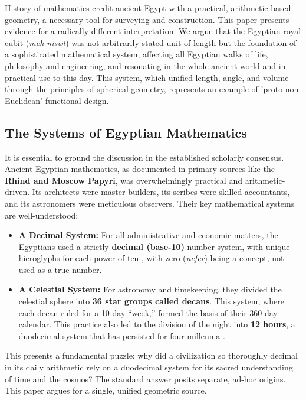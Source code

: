 \documentclass[11pt]{article}
\begin{document}
History of mathematics credit ancient Egypt with a practical, arithmetic-based geometry, a necessary tool for surveying and construction. This paper presents evidence for a radically different interpretation. We argue that the Egyptian royal cubit (\textit{meh niswt}) was not arbitrarily stated unit of length but the foundation of a sophisticated mathematical system, affecting all Egyptian walks of life, philosophy and engineering, and resonating in the whole ancient world and in practical use to this day. This system, which unified length, angle, and volume through the principles of spherical geometry, represents an example of 'proto-non-Euclidean' functional design.

\subsection{The Systems of Egyptian Mathematics}

It is essential to ground the discussion in the established scholarly consensus. Ancient Egyptian mathematics, as documented in primary sources like the \textbf{Rhind and Moscow Papyri}, was overwhelmingly practical and arithmetic-driven. Its architects were master builders, its scribes were skilled accountants, and its astronomers were meticulous observers. Their key mathematical systems are well-understood:
\begin{itemize}
    \item \textbf{A Decimal System:} For all administrative and economic matters, the Egyptians used a strictly \textbf{decimal (base-10)} number system, with unique hieroglyphs for each power of ten \cite{gardiner1957egyptian}, with zero (\textit{nefer}) being a concept, not used as a true number.
    \item \textbf{A Celestial System:} For astronomy and timekeeping, they divided the celestial sphere into \textbf{36 star groups called decans}. This system, where each decan ruled for a 10-day ``week,'' formed the basis of their 360-day calendar. This practice also led to the division of the night into \textbf{12 hours}, a duodecimal system that has persisted for four millennia \cite{neugebauer1969exact}.
\end{itemize}
This presents a fundamental puzzle: why did a civilization so thoroughly decimal in its daily arithmetic rely on a duodecimal system for its sacred understanding of time and the cosmos? The standard answer posits separate, ad-hoc origins. This paper argues for a single, unified geometric source.
\end{document}
